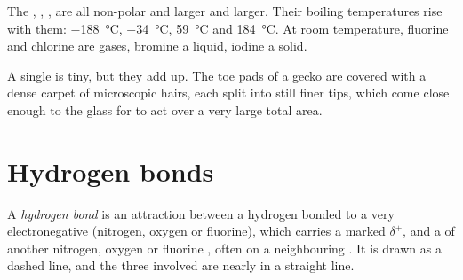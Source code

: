 \begin{example}\label{ex:g11:polarity-and-cohesion:halogens}
The  , , ,  are all non-polar and
larger and larger. Their boiling temperatures rise with them:
\qty{-188}{\celsius}, \qty{-34}{\celsius}, \qty{59}{\celsius} and
\qty{184}{\celsius}. At room temperature, fluorine and chlorine are
gases, bromine a liquid, iodine a solid.
\end{example}

\begin{remark}\label{rem:g11:polarity-and-cohesion:gecko}
A single  is tiny, but they add up. The toe
pads of a gecko are covered with a dense carpet of microscopic hairs,
each split into still finer tips, which come close enough to the glass
for  to act over a very large total area.
\end{remark}

\section{Hydrogen bonds}

\begin{definition}\label{def:g11:polarity-and-cohesion:hydrogen-bond}
A \emph{hydrogen bond} is an attraction between a
hydrogen  bonded to a very electronegative  (nitrogen, oxygen or
fluorine), which carries a marked $\delta^+$, and a  of another
nitrogen, oxygen or fluorine , often on a neighbouring . It
is drawn as a dashed line, and the three  involved are nearly in a
straight line.
\end{definition}

